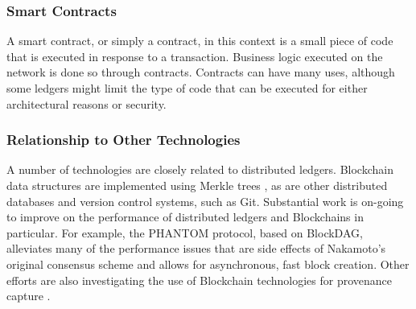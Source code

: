 \subsubsection{Smart Contracts}
A smart contract, or simply a contract, in this context is a small piece of code
that is executed in response to a transaction. Business logic executed on the
network is done so through contracts. Contracts can have many uses, although
some ledgers might limit the type of code that can be executed for either
architectural reasons or security.

\subsubsection{Relationship to Other Technologies}
A number of technologies are closely related to distributed ledgers.
Blockchain data structures are implemented using Merkle trees
\cite{merkle_digital_1987}, as are other distributed databases and version
control systems, such as Git. Substantial work is on-going to improve
on the performance of distributed ledgers and Blockchains in particular. For
example, the PHANTOM protocol, based on BlockDAG, alleviates many of the
performance issues that are side effects of Nakamoto's original consensus
scheme and allows for asynchronous, fast block creation. Other efforts are also
investigating the use of Blockchain technologies for provenance capture
\cite{richard_brooks_and_anthony_skjellum_using_2017}\cite{worley_2018}.

